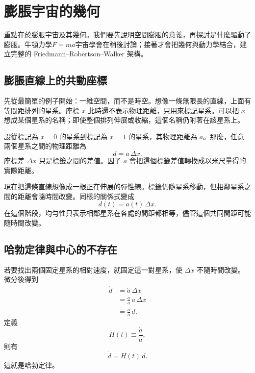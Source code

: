 \chapter{膨脹宇宙的幾何}

重點在於膨脹宇宙及其幾何。我們要先說明空間膨脹的意義，再探討是什麼驅動了膨脹。牛頓力學\(F=ma\)宇宙學會在稍後討論；接著才會把幾何與動力學結合，建立完整的 Friedmann--Robertson--Walker 架構。

\section{膨脹直線上的共動座標}

先從最簡單的例子開始：一維空間，而不是時空。想像一條無限長的直線，上面有等間距排列的星系。座標 \(x\) 此時還不表示物理距離，只用來標記星系。可以把 \(x\) 想成某個星系的名稱；即使整個排列伸展或收縮，這個名稱仍附著在該星系上。

設從標記為 \(x=0\) 的星系到標記為 \(x=1\) 的星系，其物理距離為 \(a\)。那麼，任意兩個星系之間的物理距離為
\begin{equation}
d=a\,\Delta x.
\end{equation}
座標差 \(\Delta x\) 只是標籤之間的差值。因子 \(a\) 會把這個標籤差值轉換成以米尺量得的實際距離。

現在把這條直線想像成一根正在伸展的彈性線。標籤仍隨星系移動，但相鄰星系之間的距離會隨時間改變。同樣的關係式變成
\begin{equation}
d(t)=a(t)\,\Delta x.
\end{equation}
在這個階段，均勻性只表示相鄰星系在各處的間距都相等，儘管這個共同間距可能隨時間改變。

\section{哈勃定律與中心的不存在}

若要找出兩個固定星系的相對速度，就固定這一對星系，使 \(\Delta x\) 不隨時間改變。微分後得到
\begin{align}
\dot d &= \dot a\,\Delta x \\
       &= \frac{\dot a}{a}\,a\,\Delta x \\
       &= \frac{\dot a}{a}\,d.
\end{align}
定義
\begin{equation}
H(t)\equiv \frac{\dot a}{a},
\end{equation}
則有
\begin{equation}
\dot d = H(t)\,d.
\end{equation}
這就是哈勃定律。

